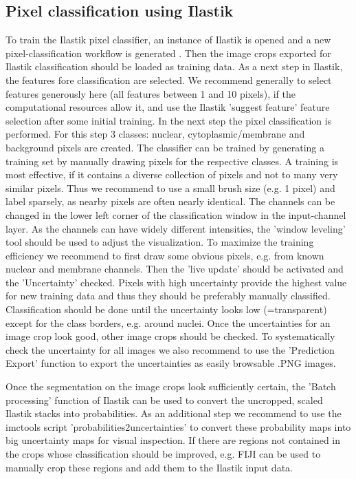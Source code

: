 \documentclass[a4paper]{article}
\begin{document}
\subsection{Pixel classification using Ilastik}
To train the Ilastik pixel classifier, an instance of Ilastik is opened and a new
pixel-classification workflow is generated \cite{sommer_ilastik:_2011}. Then the image crops exported for Ilastik
classification should be loaded as training data.
As a next step in Ilastik, the features fore classification are selected. We recommend generally to select features generously
here (all features between 1 and 10 pixels), if the computational resources allow it, and use the
Ilastik 'suggest feature' feature selection after some initial training.
In the next step the pixel classification is performed. For this step 3 classes: nuclear,
cytoplasmic/membrane and background pixels are created.
The classifier can be trained by generating a training set by manually drawing pixels for the
respective classes. A training is most effective, if it contains a diverse collection of pixels and not to many
very similar pixels. Thus we recommend to use a small brush size (e.g. 1 pixel) and label sparsely,
as nearby pixels are often nearly identical.
The channels can be changed in the lower left corner of the
classification window in the input-channel layer. As the channels can have widely different intensities, the 'window leveling'
tool should be used to adjust the visualization.
To maximize the training efficiency we recommend to first draw some obvious pixels, e.g. from
known nuclear and membrane channels. Then the 'live update' should be activated and the
'Uncertainty' checked. Pixels with high uncertainty provide the highest value for new training data
and thus they should be preferably manually classified. Classification should be done until the
uncertainty looks low (=transparent) except for the class borders, e.g. around nuclei.
Once the uncertainties for an image crop look good, other image crops should be checked.
To systematically check the uncertainty for all images we also recommend to use the 'Prediction
Export' function to export the uncertainties as easily browsable .PNG images.

Once the segmentation on the image crops look sufficiently certain, the 'Batch
processing' function of Ilastik can be used to convert the uncropped, scaled Ilastik stacks into
probabilities. As an additional step we recommend to use the imctools script
'probabilities2uncertainties' to convert these probability maps into big uncertainty maps for
visual inspection. If there are regions not contained in the crops whose classification should be
improved, e.g. FIJI can be used to manually crop these regions and add them to the Ilastik input
data. 
\end{document}
